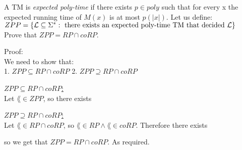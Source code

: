 A TM is {\it expected poly-time } if there exists $p \in poly$ such that for every x the
expected running time of $M(x)$ is at most $p(|x|)$.
Let us define: \\
$ZPP = \{\mathcal{L} \subseteq \Sigma^*: \text{ there exists an expected poly-time TM that decided } \mathcal{L}\}$ \\
Prove that $ZPP = RP \cap coRP$.

Proof: \\
We need to show that: \\
1. $ZPP \subseteq RP \cap coRP$
2. $ZPP \supseteq RP \cap coRP$

\underline{$ZPP \subseteq RP \cap coRP$:} \\
Let $\lang \in ZPP$, so there exists


\underline{$ZPP \supseteq RP \cap coRP$:} \\
Let $\lang \in RP \cap coRP$, so $\lang \in RP \wedge \lang \in coRP$. Therefore there exists





so we get that $ZPP = RP \cap coRP$. As required.
